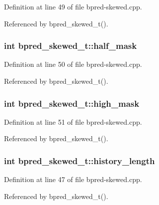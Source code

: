 Definition at line 49 of file bpred-skewed.cpp.

Referenced by bpred\_\-skewed\_\-t().
\subsubsection[{half\_\-mask}]{\setlength{\rightskip}{0pt plus 5cm}int {\bf bpred\_\-skewed\_\-t::half\_\-mask}\hspace{0.3cm}{\tt  [protected]}}\label{classbpred__skewed__t_7025422aca3383224805db0359505168}




Definition at line 50 of file bpred-skewed.cpp.

Referenced by bpred\_\-skewed\_\-t().
\subsubsection[{high\_\-mask}]{\setlength{\rightskip}{0pt plus 5cm}int {\bf bpred\_\-skewed\_\-t::high\_\-mask}\hspace{0.3cm}{\tt  [protected]}}\label{classbpred__skewed__t_8d750a1a6f0cb40e4a0f6dfecdcf525f}




Definition at line 51 of file bpred-skewed.cpp.

Referenced by bpred\_\-skewed\_\-t().
\subsubsection[{history\_\-length}]{\setlength{\rightskip}{0pt plus 5cm}int {\bf bpred\_\-skewed\_\-t::history\_\-length}\hspace{0.3cm}{\tt  [protected]}}\label{classbpred__skewed__t_4cb8ecbcedfff96e028617ea889d6921}




Definition at line 47 of file bpred-skewed.cpp.

Referenced by bpred\_\-skewed\_\-t().
